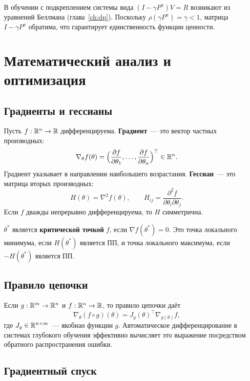 В обучении с подкреплением системы вида $(I - \gamma P^\pi) V = R$ возникают из уравнений Беллмана (глава~\ref{ch:dp}). Поскольку $\rho(\gamma P^\pi) = \gamma < 1$, матрица $I - \gamma P^\pi$ обратима, что гарантирует единственность функции ценности.

\section{Математический анализ и оптимизация}
\label{app:calculus}

\subsection*{Градиенты и гессианы}

Пусть $f : \mathbb{R}^n \to \mathbb{R}$ дифференцируема. \textbf{Градиент}~--- это вектор частных производных:
\[
    \nabla_\theta f(\theta)
    = \Bigl(\frac{\partial f}{\partial \theta_1}, \ldots,
             \frac{\partial f}{\partial \theta_n}\Bigr)^\top \in \mathbb{R}^n.
\]
Градиент указывает в направлении наибольшего возрастания. \textbf{Гессиан}~--- это матрица вторых производных:
\[
    H(\theta) = \nabla^2 f(\theta), \qquad
    H_{ij} = \frac{\partial^2 f}{\partial \theta_i \partial \theta_j}.
\]
Если $f$ дважды непрерывно дифференцируема, то $H$ симметрична.

\begin{definition}
$\theta^*$ является \textbf{критической точкой} $f$, если $\nabla f(\theta^*)=0$. Это точка локального минимума, если $H(\theta^*)$ является ПП, и точка локального максимума, если $-H(\theta^*)$ является ПП.
\end{definition}

\subsection*{Правило цепочки}

Если $g: \mathbb{R}^m \to \mathbb{R}^n$ и $f: \mathbb{R}^n \to \mathbb{R}$, то правило цепочки даёт
\[
    \nabla_\theta (f \circ g)(\theta)
    = J_g(\theta)^\top \nabla_{g(\theta)} f,
\]
где $J_g \in \mathbb{R}^{n \times m}$~--- якобиан функции $g$. Автоматическое дифференцирование в системах глубокого обучения эффективно вычисляет это выражение посредством обратного распространения ошибки.

\subsection*{Градиентный спуск}

